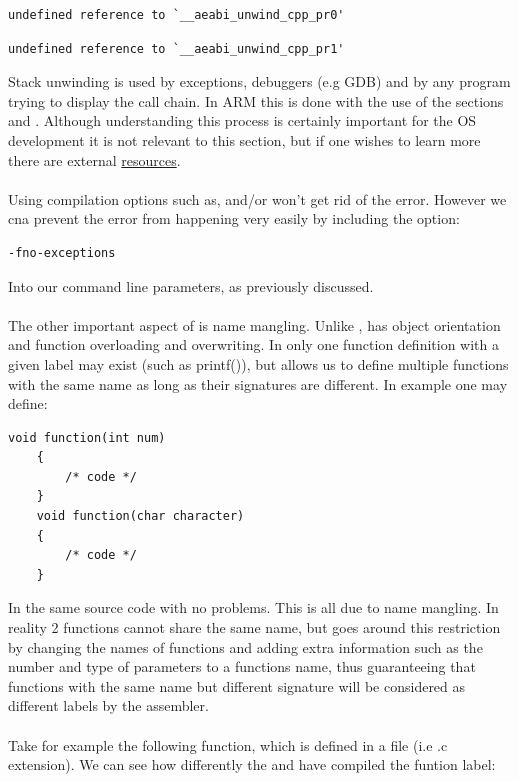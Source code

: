 \documentclass[12pt, svgnames]{book}
\begin{document}
\begin{lstlisting}[style=bash]
	undefined reference to `__aeabi_unwind_cpp_pr0'
\end{lstlisting}

\begin{lstlisting}[style=bash]
	undefined reference to `__aeabi_unwind_cpp_pr1'
\end{lstlisting}

Stack unwinding is used by exceptions, debuggers (e.g GDB) and by any program trying to display the call chain. In ARM this is done with the use of the sections  and . Although understanding this process is certainly important for the OS development it is not relevant to this section, but if one wishes to learn more there are external \href{https://wiki.linaro.org/KenWerner/Sandbox/libunwind?action=AttachFile&do=get&target=libunwind-LDS.pdf}{resources}.
\\~\\
Using compilation options such as,  and/or  won't get rid of the error. However we cna prevent the error from happening very easily by including the option:

\begin{lstlisting}[]
	-fno-exceptions
\end{lstlisting}

Into our  command line parameters, as previously discussed. 
\\~\\
The other important aspect of  is name mangling. Unlike ,  has object orientation and function overloading and overwriting. In  only one function definition with a given label may exist (such as printf()), but  allows us to define multiple functions with the same name as long as their signatures are different. In example one may define:

\begin{lstlisting}[style=C]
	void function(int num)
	{
		/* code */
	}
	void function(char character)
	{
		/* code */
	}
\end{lstlisting}

In the same  source code with no problems. This is all due to name mangling. In reality 2 functions cannot share the same name, but  goes around this restriction by changing the names of functions and adding extra information such as the number and type of parameters to a functions name, thus guaranteeing that functions with the same name but different signature will be considered as different labels by the assembler.
\\~\\
Take for example the following function, which is defined in a  file (i.e .c extension). We can see how differently the  and  have compiled the funtion label:
\end{document}
